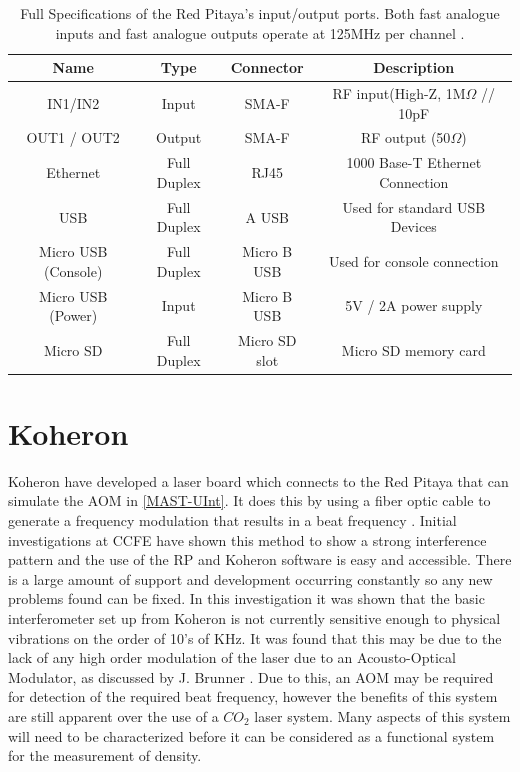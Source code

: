 \documentclass[12pt,a4paper,oneside]{report}
\begin{document}
\begin{table}[H]
	\setlength\arrayrulewidth{1pt}
    \begin{tabular}{ c c c c } 
        Name & Type & Connector & Description\\
        \hline
        IN1/IN2 & Input & SMA-F & RF input(High-Z, 1M$\Omega$ // 10pF\\[1pt]
        OUT1 / OUT2 & Output & SMA-F & RF output (50$\Omega$)\\[1pt]
        Ethernet & Full Duplex & RJ45 & 1000 Base-T Ethernet Connection\\[1pt]
        USB & Full Duplex & A USB & Used for standard USB Devices\\[1pt]
        Micro USB (Console) & Full Duplex & Micro B USB & Used for console connection\\[1pt]
        Micro USB (Power) & Input & Micro B USB & 5V / 2A power supply\\[1pt]
        Micro SD & Full Duplex & Micro SD slot & Micro SD memory card\\
    \end{tabular}
    \caption{Full Specifications of the Red Pitaya's input/output ports. Both fast analogue inputs and fast analogue outputs operate at 125MHz per channel \cite[p.~7]{Leban2014RedManual}.}
    \label{RPspec}
\end{table}

\section{Koheron}
Koheron have developed a laser board which connects to the Red Pitaya that can simulate the AOM in \autoref{MAST-UInt}. It does this by using a fiber optic cable to generate a frequency modulation that results in a beat frequency \cite{KoheronAmplitudeKoheron}. Initial investigations at CCFE \cite{Hickling2017InvestigationMAST-U} have shown this method to show a strong interference pattern and the use of the RP and Koheron software is easy and accessible. There is a large amount of support and development occurring constantly so any new problems found can be fixed. In this investigation it was shown that the basic interferometer set up from Koheron is not currently sensitive enough to physical vibrations on the order of 10's of KHz. It was found that this may be due to the lack of any high order modulation of the laser due to an Acousto-Optical Modulator, as discussed by J. Brunner \cite[p. ~29]{Brunner2017}. Due to this, an AOM may be required for detection of the required beat frequency, however the benefits of this system are still apparent over the use of a $CO_{2}$ laser system. Many aspects of this system will need to be characterized before it can be considered as a functional system for the measurement of density.
\end{document}
